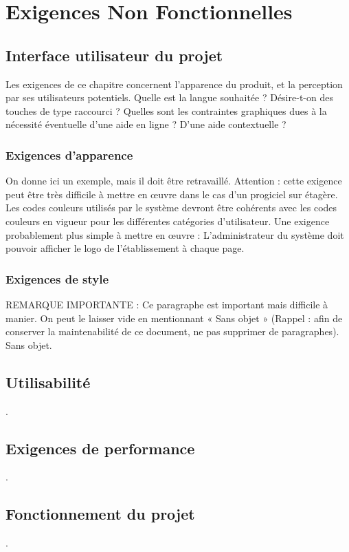 	\section{Exigences Non Fonctionnelles}
		\subsection{Interface utilisateur du projet}
		
		Les exigences de ce chapitre concernent l’apparence du produit, et la perception par ses utilisateurs potentiels. \newline
		Quelle est la langue souhaitée ?\newline
		Désire-t-on des touches de type raccourci ?\newline
		Quelles sont les contraintes graphiques dues à la nécessité éventuelle d’une aide en
ligne ? D’une aide contextuelle ?\newline
		\subsubsection{Exigences d’apparence} 
On donne ici un exemple, mais il doit être retravaillé.\newline
Attention : cette exigence peut être très difficile à mettre en œuvre dans le cas d’un progiciel sur étagère.
Les codes couleurs utilisés par le système devront être cohérents avec les codes couleurs en vigueur pour les différentes catégories d’utilisateur.
Une exigence probablement plus simple à mettre en œuvre :
L’administrateur du système doit pouvoir afficher le logo de l’établissement à chaque page.\newline
		\subsubsection{Exigences de style}
REMARQUE IMPORTANTE :
Ce paragraphe est important mais difficile à manier. On peut le laisser vide en mentionnant « Sans objet » (Rappel : afin de conserver la maintenabilité de ce document, ne pas supprimer de paragraphes).
Sans objet.

		\subsection{Utilisabilité}
		.
		\subsection{Exigences de performance}
		.
		\subsection{Fonctionnement du projet}
		.
